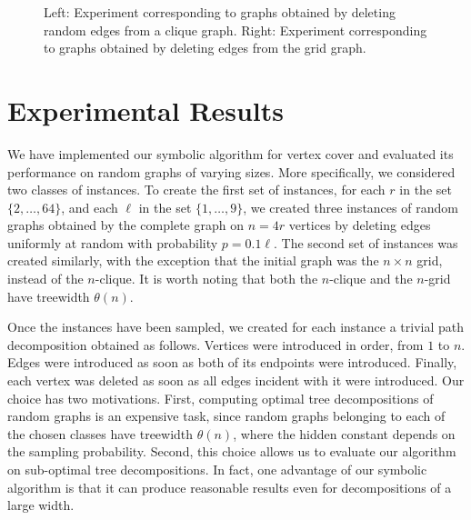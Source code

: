 
\begin{figure}[t]
    \begin{subfigure}{0.48\textwidth}
        \centering
         \resizebox{\textwidth}{!}{}
        \label{fig:clique}
    \end{subfigure}
    \hfill
    \begin{subfigure}{0.48\textwidth}       
    \centering
    \resizebox{\textwidth}{!}{}
        \label{fig:grid}
    \end{subfigure}
    \caption{Left: Experiment corresponding to graphs obtained by deleting random edges from a clique graph. Right: Experiment corresponding to graphs obtained by deleting edges from the grid graph. \label{fig:ComparisonSizes}}
   
\end{figure}



\section{Experimental Results}

We have implemented our symbolic algorithm for vertex cover and evaluated its performance on random graphs of varying sizes. More specifically, we considered two classes of instances. To create the first set of instances, for each $r$ in the set $\{2,\dots,64\}$, and each $\ell$ in the set $\{1,\dots,9\}$, we created three instances of random graphs obtained by the complete graph on $n=4r$ vertices by deleting edges uniformly at random with probability $p=0.1\ell$. The second set of instances was created similarly, with the exception that the initial graph was the $n\times n$ grid, instead of the $n$-clique. It is worth noting that both the $n$-clique and the $n$-grid have treewidth $\theta(n)$. 

Once the instances have been sampled, we created for each instance a trivial path decomposition obtained as follows. Vertices were introduced in order, from $1$ to $n$. Edges were introduced as soon as both of its endpoints were introduced. Finally, each vertex was deleted as soon as all edges incident with it were introduced. Our choice has two motivations. First, computing optimal tree decompositions of random graphs is an expensive task, since random graphs belonging to each of the chosen classes have treewidth $\theta(n)$, where the hidden constant depends on the sampling probability. Second, this choice allows us to evaluate our algorithm on sub-optimal tree decompositions. In fact, one advantage of our symbolic algorithm is that it can produce reasonable results even for decompositions of a large width. 

